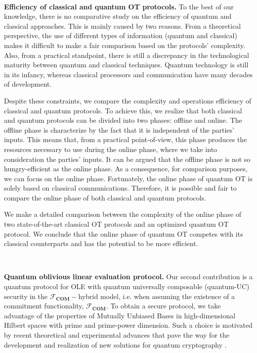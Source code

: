 \

\noindent\textbf{Efficiency of classical and quantum OT protocols.} To the best of our knowledge, there is no comparative study on the efficiency of quantum and classical approaches. This is mainly caused by two reasons. From a theoretical perspective, the use of different types of information (quantum and classical) makes it difficult to make a fair comparison based on the protocols' complexity. Also, from a practical standpoint, there is still a discrepancy in the technological maturity between quantum and classical techniques. Quantum technology is still in its infancy,  whereas classical processors and communication have many decades of development. 

Despite these constraints, we compare the complexity and operations efficiency of classical and quantum protocols. To achieve this, we realize that both classical and quantum protocols can be divided into two phases: offline and online. The offline phase is characterize by the fact that it is independent of the parties' inputs. This means that, from a practical point-of-view, this phase produces the resources necessary to use during the online phase, where we take into consideration the parties' inputs. It can be argued that the offline phase is not so hungry-efficient as the online phase. As a consequence, for comparison purposes, we can focus on the online phase. Fortunately, the online phase of quantum OT is solely based on classical communications. Therefore, it is possible and fair to compare the online phase of both classical and quantum protocols. 

We make a detailed comparison between the complexity of the online phase of two state-of-the-art classical OT protocols \cite{ALSZ13, KOS15} and an optimized quantum OT protocol. We conclude that the online phase of quantum OT competes with its classical counterparts and has the potential to be more efficient.

\

\noindent\textbf{Quantum oblivious linear evaluation protocol.} Our second contribution is a quantum protocol for OLE with quantum universally composable (quantum-UC) security in the $\mathcal{F}_{\textbf{COM}}-$hybrid model, i.e. when assuming the existence of a commitment functionality, $\mathcal{F}_{\textbf{COM}}$. To obtain a secure protocol, we take advantage of the properties of Mutually Unbiased Bases in high-dimensional Hilbert spaces with prime and prime-power dimension. Such a choice is motivated by recent theoretical and experimental advances that pave the way for the development and realization of new solutions for quantum cryptography \cite{BPT00,DEBZ10,Zhongetal2015,BHVBFHM18,DHMPPV21}. 

